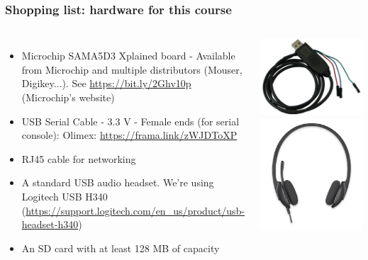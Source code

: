 \begin{frame}
\frametitle{Shopping list: hardware for this course}
  \begin{columns}
    \footnotesize
    \begin{itemize}
      \item Microchip SAMA5D3 Xplained board - Available from Microchip and
	    multiple distributors (Mouser, Digikey...).
	    See \url{https://bit.ly/2Ghv10p} (Microchip's website)
      \item USB Serial Cable - 3.3 V - Female ends (for serial console):
	    Olimex: \url{https://frama.link/zWJDToXP}
      \item RJ45 cable for networking
      \item A standard USB audio headset. We're using Logitech USB H340
            (\url{https://support.logitech.com/en_us/product/usb-headset-h340})
      \item An SD card with at least 128 MB of capacity
    \end{itemize}
    \includegraphics[height=0.20\textheight]{common/usb-serial-cable-female.png} \\
    \vspace{1cm}
    \includegraphics[height=0.15\textheight]{common/logitech-h340.png} \\

\end{columns}
\end{frame}
